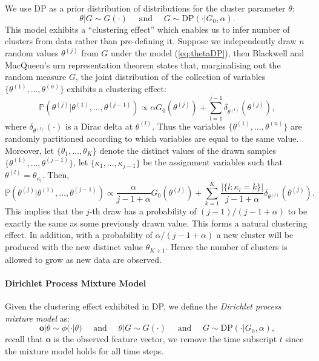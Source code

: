 We use DP as a prior distribution of distributions for the cluster parameter $\theta$:
\begin{equation}
\theta | G \sim G(\cdot) \quad\text{ and }\quad G \sim \text{DP} (\cdot | G_0, \alpha).
\label{eq:thetaDP}
\end{equation}
This model exhibits a ``clustering effect'' which enables us to infer number of clusters from data rather than pre-defining it. Suppose we independently draw $n$ random values $\theta^{(j)}$ from $G$ under the model (\ref{eq:thetaDP}), then Blackwell and MacQueen's urn representation theorem \cite{blackwellm73} states that, marginalising out the random measure $G$, the joint distribution of the collection of variables $\{\theta^{(1)}, \dots, \theta^{(n)}\}$ exhibits a clustering effect:
\begin{equation}
\mathbb{P} \left( \theta^{(j)} | \theta^{(1)}, \dots, \theta^{(j-1)} \right) \propto \alpha G_0 (\theta^{(j)}) + \sum_{l=1}^{j-1} \delta_{\theta^{(l)}} (\theta^{(j)}),
\end{equation}
where $\delta_{\theta^{(l)}} (\cdot)$ is a Dirac delta at ${\theta^{(l)}}$. Thus the variables $\{\theta^{(1)}, \dots, \theta^{(n)}\}$ are randomly partitioned according to which variables are equal to the same value. Moreover, let $\{ \theta_1, \dots, \theta_K \}$ denote the distinct values of the drawn samples $\{\theta^{(1)}, \dots, \theta^{(j-1)}\}$, let $\{\kappa_1, \dots, \kappa_{j-1}\}$ be the assignment variables such that $\theta^{(l)} = \theta_{\kappa_l}$. Then,
\begin{equation}
\mathbb{P} \left( \theta^{(j)} | \theta^{(1)}, \dots, \theta^{(j-1)} \right) \propto \frac{\alpha}{j-1+\alpha} G_0 (\theta^{(j)}) + \sum_{k=1}^{K} \frac{\vert \{ l: \kappa_l = k \} \vert}{j-1+\alpha}  \delta_{\theta^{(l)}} (\theta^{(j)}).
\end{equation}
This implies that the $j$-th draw has a probability of $(j-1)/(j-1+\alpha)$ to be exactly the same as some previously drawn value. This forms a natural clustering effect. In addition, with a probability of $\alpha/(j-1+\alpha)$ a new cluster will be produced with the new distinct value $\theta_{K+1}$. Hence the number of clusters is allowed to grow as new data are observed.

\paragraph*{Dirichlet Process Mixture Model}

Given the clustering effect exhibited in DP, we define the \textit{Dirichlet process mixture model} as:
\begin{equation}
\mathbf{o} | \theta \sim \phi(\cdot | \theta) \quad\text{ and }\quad  \theta | G \sim G(\cdot) \quad\text{ and }\quad G \sim \text{DP} (\cdot | G_0, \alpha),
\label{eq:DPMM}
\end{equation}
recall that $\mathbf{o}$ is the observed feature vector, we remove the time subscript $t$ since the mixture model holds for all time steps.

